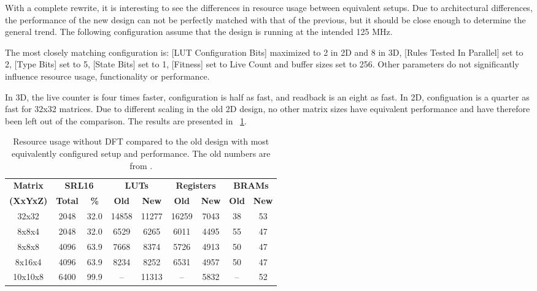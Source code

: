 With a complete rewrite, it is interesting to see the differences in resource usage between equivalent setups.
Due to architectural differences, the performance of the new design can not be perfectly matched with that of the previous, but it should be close enough to determine the general trend.
The following configuration assume that the design is running at the intended 125 MHz.

The most closely matching configuration is:
[LUT Configuration Bits] maximized to 2 in 2D and 8 in 3D,
[Rules Tested In Parallel] set to 2,
[Type Bits] set to 5,
[State Bits] set to 1,
[Fitness] set to Live Count
and buffer sizes set to 256.
Other parameters do not significantly influence resource usage, functionality or performance.

In 3D, the live counter is four times faster, configuration is half as fast, and readback is an eight as fast.
In 2D, configuation is a quarter as fast for 32x32 matrices.
Due to different scaling in the old 2D design, no other matrix sizes have equivalent performance and have therefore been left out of the comparison.
The results are presented in \tablename~\ref{tab:resource-usage}.

\begin{table}[!ht]
    \renewcommand{\arraystretch}{1.4}
    \centering
    \begin{tabular}{c|c|c|c|c|c|c|c|c}
        \bfseries Matrix & \multicolumn{2}{c|}{\bfseries SRL16} & \multicolumn{2}{c|}{\bfseries LUTs} & \multicolumn{2}{c|}{\bfseries Registers} & \multicolumn{2}{c}{\bfseries BRAMs} \\
        \bfseries (XxYxZ) & \bfseries Total & \bfseries \% & \bfseries Old & \bfseries New & \bfseries Old & \bfseries New & \bfseries Old & \bfseries New \\
        \hline
        32x32 & 2048 & 32.0 & 14858 & 11277 & 16259 & 7043 & 38 & 53 \\
        8x8x4 & 2048 & 32.0 & 6529 & 6265 & 6011 & 4495 & 55 & 47 \\
        8x8x8 & 4096 & 63.9 & 7668 & 8374 & 5726 & 4913 & 50 & 47 \\
        8x16x4 & 4096 & 63.9 & 8234 & 8252 & 6531 & 4957 & 50 & 47 \\
        10x10x8 & 6400 & 99.9 & – & 11313 & – & 5832 & – & 52 \\
    \end{tabular}
    \caption[Resource usage]{
        Resource usage without DFT compared to the old design with most equivalently configured setup and performance.
        The old numbers are from \cite{stovneng2014sblock}.
    }
    \label{tab:resource-usage}
\end{table}

